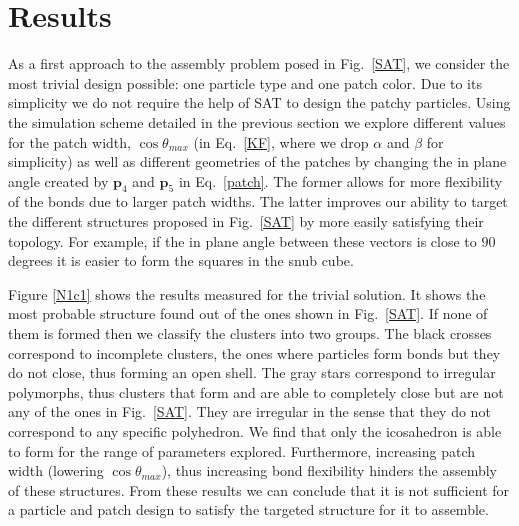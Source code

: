 \documentclass[a4paper, amsfonts, amssymb, amsmath, reprint, showkeys, nofootinbib, twoside]{revtex4-1}
\begin{document}
\section{Results}

As a first approach to the assembly problem posed in Fig.~\ref{SAT}, we consider the most trivial design possible: one particle type and one patch color. Due to its simplicity we do not require the help of SAT to design the patchy particles. Using the simulation scheme detailed in the previous section we explore different values for the patch width, $\cos\theta_{max}$ (in Eq.~\ref{KF}, where we drop $\alpha$ and $\beta$ for simplicity) as well as different geometries of the patches by changing the in plane angle created by $\textbf{p}_4$ and $\textbf{p}_5$ in Eq.~\ref{patch}. The former allows for more flexibility of the bonds due to larger patch widths. The latter improves our ability to target the different structures proposed in Fig.~\ref{SAT} by more easily satisfying their topology. For example, if the in plane angle between these vectors is close to $90$ degrees it is easier to form the squares in the snub cube.

Figure \ref{N1c1} shows the results measured for the trivial solution. It shows the most probable structure found out of the ones shown in Fig.~\ref{SAT}. If none of them is formed then we classify the clusters into two groups. The black crosses correspond to incomplete clusters, the ones where particles form bonds but they do not close, thus forming an open shell. The gray stars correspond to irregular polymorphs, thus clusters that form and are able to completely close but are not any of the ones in Fig.~\ref{SAT}. They are irregular in the sense that they do not correspond to any specific polyhedron. We find that only the icosahedron is able to form for the range of parameters explored. Furthermore, increasing patch width (lowering $\cos\theta_{max}$), thus increasing bond flexibility hinders the assembly of these structures. From these results we can conclude that it is not sufficient for a particle and patch design to satisfy the targeted structure for it to assemble.
\end{document}
